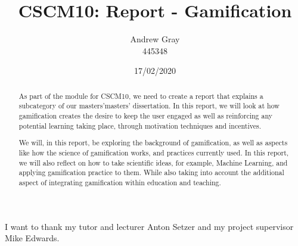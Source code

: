 \documentclass[11pt, a4paper, openright]{custard}
\begin{document}
	\title{CSCM10: Report - Gamification}
	\author{Andrew Gray\protect\\{\normalsize 445348}}
	
	
	
	\date{17/02/2020}
	
	
	\frontmatter%
	\maketitle
	\cleardoublepage

	\begin{abstract}
		\vspace{-2em}
		\setcounter{page}{1}
		
		As part of the module for CSCM10, we need to create a report that explains a subcategory of our masters’masters’ dissertation. In this report, we will look at how gamification creates the desire to keep the user engaged as well as reinforcing any potential learning taking place, through motivation techniques and incentives.  
		
		We will, in this report, be exploring the background of gamification, as well as aspects like how the science of gamification works, and practices currently used. In this report, we will also reflect on how to take scientific ideas, for example, Machine Learning, and applying gamification practice to them. While also taking into account the additional aspect of integrating gamification within education and teaching.
	\end{abstract}
	
	\begin{Acknowledgements}
		I want to thank my tutor and lecturer Anton Setzer and my project supervisor Mike Edwards. 
	\end{Acknowledgements}
	
\end{document}
